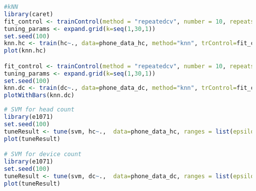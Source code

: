 \begin{lstlisting}[language=R, caption=Tuning k-Nearest Neighbors regression. Number of neighbors ($k$) is the tuning parameter., label=r-code-knn]
#kNN
library(caret)
fit_control <- trainControl(method = "repeatedcv", number = 10, repeats = 10)
tuning_params <- expand.grid(k=seq(1,30,1))
set.seed(100)
knn.hc <- train(hc~., data=phone_data_hc, method="knn", trControl=fit_control, tuneGrid = tuning_params)
plot(knn.hc)

fit_control <- trainControl(method = "repeatedcv", number = 10, repeats = 10)
tuning_params <- expand.grid(k=seq(1,30,1))
set.seed(100)
knn.dc <- train(dc~., data=phone_data_dc, method="knn", trControl=fit_control, tuneGrid = tuning_params)
plotWithBars(knn.dc)
\end{lstlisting}













\begin{lstlisting}[language=R, caption=Tuning Support Vector Machine regression. Epsilon ($\epsilon$) and \texttt{cost} are the tuning parameters. , label=r-code-svm]
# SVM for head count
library(e1071)
set.seed(100)
tuneResult <- tune(svm, hc~.,  data=phone_data_hc, ranges = list(epsilon = seq(0,1,0.1), cost = (1:10)))
plot(tuneResult)

# SVM for device count
library(e1071)
set.seed(100)
tuneResult <- tune(svm, dc~.,  data=phone_data_dc, ranges = list(epsilon = seq(0,1,0.1), cost = (1:10)))
plot(tuneResult)
\end{lstlisting}




